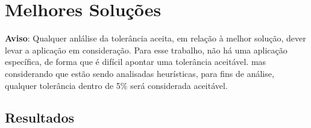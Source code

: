 \section{Melhores Soluções}
\label{section:best-solutions}

\textbf{Aviso}: Qualquer anlálise da tolerância aceita, em relação à melhor solução, dever levar a aplicação em consideração. Para esse trabalho, não há uma aplicação específica, de forma que é difícil apontar uma tolerância aceitável. mas considerando que estão sendo analisadas heurísticas, para fins de análise, qualquer tolerância dentro de 5\% será considerada aceitável.

\subsection{Resultados}
\label{subsection:best-solutions-results}
